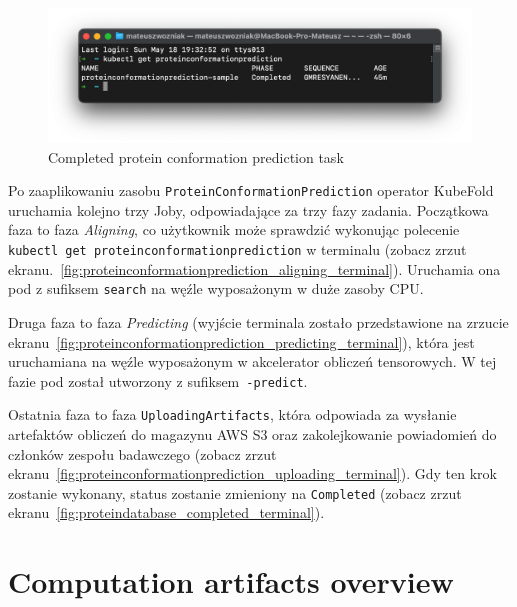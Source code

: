 \begin{figure}[htbp]
    \centering
    \includegraphics[width=\textwidth]{images/proteinconformationprediction_completed_terminal}
    \caption{Completed protein conformation prediction task}
    \label{fig:proteinconformationprediction_completed_terminal}
\end{figure}

Po zaaplikowaniu zasobu \texttt{ProteinConformationPrediction} operator KubeFold uruchamia kolejno trzy Joby, odpowiadające za trzy fazy zadania.
Początkowa faza to faza \textit{Aligning}, co użytkownik może sprawdzić wykonując polecenie \texttt{kubectl get proteinconformationprediction} w terminalu (zobacz zrzut ekranu.~\ref{fig:proteinconformationprediction_aligning_terminal}). Uruchamia ona pod z sufiksem \texttt{\-search} na węźle wyposażonym w duże zasoby CPU.

Druga faza to faza \textit{Predicting} (wyjście terminala zostało przedstawione na zrzucie ekranu~\ref{fig:proteinconformationprediction_predicting_terminal}), która jest uruchamiana na węźle wyposażonym w akcelerator obliczeń tensorowych.
W tej fazie pod został utworzony z sufiksem~\texttt{-predict}.

Ostatnia faza to faza \texttt{UploadingArtifacts}, która odpowiada za wysłanie artefaktów obliczeń do magazynu AWS S3 oraz zakolejkowanie powiadomień do członków zespołu badawczego (zobacz zrzut ekranu~\ref{fig:proteinconformationprediction_uploading_terminal}). Gdy ten krok zostanie wykonany, status zostanie zmieniony na \texttt{Completed} (zobacz zrzut ekranu~\ref{fig:proteindatabase_completed_terminal}).


\section{Computation artifacts overview}